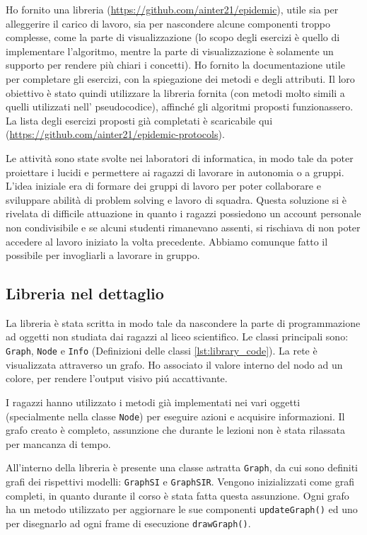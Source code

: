 Ho fornito una libreria (\href{https://github.com/ainter21/epidemic}{https://github.com/ainter21/epidemic}), utile sia per alleggerire il carico di lavoro, sia per nascondere alcune componenti troppo complesse, come la parte di visualizzazione (lo scopo degli esercizi è quello di implementare l’algoritmo, mentre la parte di visualizzazione è solamente un supporto per rendere più chiari i concetti).
Ho fornito la documentazione utile per completare gli esercizi, con la spiegazione dei metodi e degli attributi. Il loro obiettivo è stato quindi utilizzare la libreria fornita (con metodi molto simili a quelli utilizzati nell' pseudocodice), affinché gli algoritmi proposti funzionassero. La lista degli esercizi proposti già completati è scaricabile qui (\href{https://github.com/ainter21/epidemic-protocols}{https://github.com/ainter21/epidemic-protocols}).

Le attività sono state svolte nei laboratori di informatica, in modo tale da poter proiettare i lucidi e permettere ai ragazzi di lavorare in autonomia o a gruppi. L'idea iniziale era di formare dei gruppi di lavoro per poter collaborare e sviluppare abilità di problem solving e lavoro di squadra. Questa soluzione si è rivelata di difficile attuazione in quanto i ragazzi possiedono un account personale non condivisibile e se alcuni studenti rimanevano assenti, si rischiava di non poter accedere al lavoro iniziato la volta precedente. Abbiamo comunque fatto il possibile per invogliarli a lavorare in gruppo.

\subsection{Libreria nel dettaglio}
La libreria è stata scritta in modo tale da nascondere la parte di programmazione ad oggetti non studiata dai ragazzi al liceo scientifico. Le classi principali sono: \texttt{Graph}, \texttt{Node} e \texttt{Info} (Definizioni delle classi \ref{lst:library_code}). La rete è visualizzata attraverso un grafo. Ho associato il valore interno del nodo ad un colore, per rendere l'output visivo piú accattivante.

I ragazzi hanno utilizzato i metodi già implementati nei vari oggetti (specialmente nella classe \texttt{Node}) per eseguire azioni e acquisire informazioni. Il grafo creato è completo, assunzione che durante le lezioni non è stata rilassata per mancanza di tempo.

All'interno della libreria è presente una classe astratta \texttt{Graph}, da cui sono definiti grafi dei rispettivi modelli: \texttt{GraphSI} e \texttt{GraphSIR}. Vengono inizializzati come grafi completi, in quanto durante il corso è stata fatta questa assunzione. Ogni grafo ha un metodo utilizzato per aggiornare le sue componenti \texttt{updateGraph()} ed uno per disegnarlo ad ogni frame di esecuzione \texttt{drawGraph()}. 

